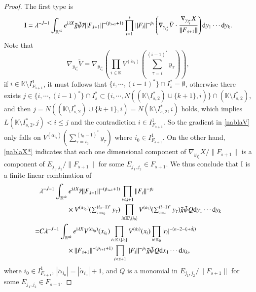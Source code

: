 \documentclass[11pt,reqno]{amsart}
\def\d{{\rm d}}
\numberwithin{equation}{section}
\theoremstyle{definition}
\begin{document}
\begin{proof}
	The first type is
	\begin{equation*}
		\mathrm{I}=\lambda^{-\dot{J}-1}\int_{\mathbb{R}^{nk}}e^{\mathrm{i}\lambda X}\tilde{g}\tilde{\psi}\tilde{r}\|F_{\dot{s}+1}\|^{-(\dot{p}_{\dot{s}+1}+1)}\prod_{i=1}^{\dot{s}}\|F_i\|^{-{\dot{p}_i}}\left(\nabla_{y_{I_{\dot{s}}^*}}\tilde{V}\cdot\frac{\nabla_{y_{I_{\dot{s}}^*}}X}{\|F_{\dot{s}+1}\|}\right)\d y_1\cdots \d y_k.
	\end{equation*}
	Note that
	\begin{equation}\label{nablaV}
		\nabla_{y_{I_{\dot{s}}^*}}\tilde{V}=\nabla_{y_{I_{\dot{s}}^*}}\mbox{$\left(\prod_{i\in\mathbb{K}}V^{(\dot{\alpha}_i)}(\sum_{\tau=i}^{(i-1)^*}y_\tau)\right)$},
	\end{equation}
	if $i\in\mathbb{K}\setminus I_{F_{\dot{s}+1}}^1$, it must follows that $\{i,\cdots,(i-1)^*\}\cap I_{\dot{s}}^*=\emptyset$, otherwise there exists $j\in\{i,\cdots,(i-1)^*\}\cap I_{\dot{s}}^*\subset\{i,\cdots,N((\mathbb{K}\setminus I_{\dot{s},2}^*)\cup\{k+1\},i)\}\cap(\mathbb{K}\setminus I_{\dot{s},2}^*)$, and then $j=N((\mathbb{K}\setminus I_{\dot{s},2}^*)\cup\{k+1\},i)=N(\mathbb{K}\setminus I_{\dot{s},2}^*,i)$ holds, which implies $L(\mathbb{K}\setminus I_{\dot{s},2}^*,j)<i\leq j$ and the contradiction $i\in I_{F_{\dot{s}+1}}^1$. So the gradient in \eqref{nablaV} only falls on $V^{(\dot{\alpha}_{i_0})}(\sum_{\tau=i_0}^{(i_0-1)^*}y_\tau)$ where $i_0\in I_{F_{\dot{s}+1}}^1$. On the other hand, \eqref{nablaX*} indicates that each one dimensional component of $\nabla_{y_{I_{\dot{s}}^*}} X/\|F_{\dot{s}+1}\|$ is a component of $E_{j_1,j_2}/\|F_{\dot{s}+1}\|$ for some $E_{j_1,j_2}\in F_{\dot{s}+1}$. We thus conclude that $\mathrm{I}$ is a finite linear combination of
	\begin{equation}\label{Icom}
		\begin{split}
			&\lambda^{-\dot{J}-1}\int_{\mathbb{R}^{nk}}e^{\mathrm{i}\lambda X}\tilde{r}\|F_{\dot{s}+1}\|^{-(\dot{p}_{\dot{s}+1}+1)}\prod_{i<\dot{s}+1}\|F_i\|^{-{\dot{p}_i}}\\
			&\quad\quad\quad\quad\times V^{(\ddot{\alpha}_{i_0})}(\mbox{$\sum_{\tau=i_0}^{(i_0-1)^*}y_\tau$})\prod_{i\in\mathbb{K}\setminus\{i_0\}}V^{(\dot{\alpha}_i)}(\mbox{$\sum_{\tau=i}^{(i-1)^*}y_\tau$})\tilde{g}\tilde{\psi}Q \d y_1\cdots \d y_k\\
			=&C\lambda^{-\dot{J}-1}\int_{\mathbb{R}^{nk}}e^{\mathrm{i}\lambda X}V^{(\ddot{\alpha}_{i_0})}(x_{i_0})\prod_{i\in\mathbb{K}\setminus\{i_0\}}V^{(\dot{\alpha}_i)}(x_i)\prod_{i\in\mathbb{K}_0}|r_i|^{-(n-2-l_i+\dot{d}_i)}\\
			&\quad\quad\quad\quad\times\|F_{\dot{s}+1}\|^{-(\dot{p}_{\dot{s}+1}+1)}\prod_{i<\dot{s}+1}\|F_i\|^{-{\dot{p}_i}}\tilde{g}\tilde{\psi}Q \d x_1\cdots \d x_k,
		\end{split}
	\end{equation}
	where $i_0\in I_{F_{\dot{s}+1}}^1$, $|\ddot{\alpha}_{i_0}|=|\dot{\alpha}_{i_0}|+1$, and $Q$ is a monomial in $E_{j_1,j_2}/\|F_{\dot{s}+1}\|$ for some $E_{j_1,j_2}\in F_{\dot{s}+1}$.
	

\end{proof}
\end{document}
